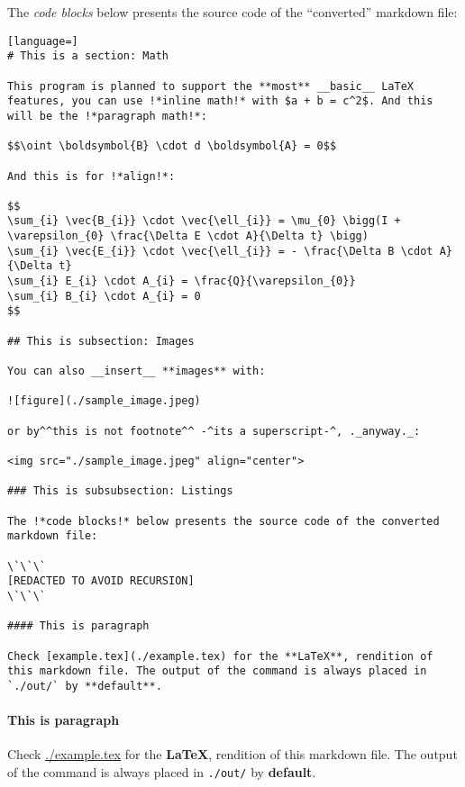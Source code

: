 \documentclass[12pt, UTF8]{article}
\begin{document}
	The \emph{code blocks} below presents the source code of the ``converted'' markdown file:
	
	
\begin{lstlisting}[language=]
# This is a section: Math

This program is planned to support the **most** __basic__ LaTeX features, you can use !*inline math!* with $a + b = c^2$. And this will be the !*paragraph math!*:

$$\oint \boldsymbol{B} \cdot d \boldsymbol{A} = 0$$

And this is for !*align!*:

$$
\sum_{i} \vec{B_{i}} \cdot \vec{\ell_{i}} = \mu_{0} \bigg(I + \varepsilon_{0} \frac{\Delta E \cdot A}{\Delta t} \bigg)
\sum_{i} \vec{E_{i}} \cdot \vec{\ell_{i}} = - \frac{\Delta B \cdot A}{\Delta t}
\sum_{i} E_{i} \cdot A_{i} = \frac{Q}{\varepsilon_{0}}
\sum_{i} B_{i} \cdot A_{i} = 0
$$

## This is subsection: Images

You can also __insert__ **images** with:

![figure](./sample_image.jpeg)

or by^^this is not footnote^^ -^its a superscript-^, ._anyway._:

<img src="./sample_image.jpeg" align="center">

### This is subsubsection: Listings

The !*code blocks!* below presents the source code of the converted markdown file:

\`\`\`
[REDACTED TO AVOID RECURSION]
\`\`\`

#### This is paragraph

Check [example.tex](./example.tex) for the **LaTeX**, rendition of this markdown file. The output of the command is always placed in `./out/` by **default**.

\end{lstlisting}
	
	\paragraph{This is paragraph}
	
	Check \href{example.tex}{./example.tex} for the \textbf{LaTeX}, rendition of this markdown file. The output of the command is always placed in \texttt{./out/} by \textbf{default}.
	
\end{document}
